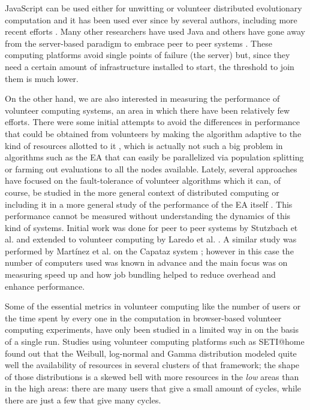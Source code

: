 \documentclass[letterpaper]{article}
\begin{document}
JavaScript can be used either for unwitting
\citep{unwitting-ec,boldrin2007distributed} or volunteer 
\citep{langdon:2005:metas,gecco07:workshop:dcor} distributed
evolutionary computation and it has been used ever since by several
authors, including more recent efforts
\citep{Desell:2008:AHG:1389095.1389273,duda2013distributed,DBLP:journals/corr/abs-0801-1210}. Many other researchers have
used Java \citep{chong:1999:jDGPi} and others have gone away from the
server-based paradigm to embrace peer to peer systems
\citep{jin2006constructing,10.1109/ICICSE.2008.99,DBLP:conf/3pgcic/GuervosMFEL12}. These computing
platforms avoid single points of failure (the server) but, since they
need a certain amount of infrastructure installed to start, the
threshold to join them is much lower.


On the other hand, we are also interested in measuring the performance
of volunteer computing systems, an area in which there have been
relatively few efforts.
There were some initial attempts to avoid the differences in performance
that could be obtained from volunteers  by making
the algorithm adaptive to the kind of resources allotted to it
\citep{milani2004online}, which is actually not such a big problem in
algorithms such as the EA that can easily be
parallelized via population splitting or farming out evaluations to all
the nodes available. Lately, several approaches have focused on the
fault-tolerance of volunteer algorithms
\citep{gonzalez2010characterizing} which it can, of course, be studied in
the more general context of distributed computing 
\citep{nogueras2015studying} or including it in a more general study of the
performance of the EA itself
\citep{DBLP:journals/gpem/LaredoBGVAGF14}. This performance cannot be
measured without understanding the dynamics of this kind of systems. Initial
work was done for peer to peer systems by Stutzbach et
al. \citep{stutzbach2006understanding} and extended to volunteer
computing by Laredo et al. \citep{churn08,laredo2008rcp}. A similar
study was performed by Martínez et al. on the Capataz system
\citep{martinez2015capataz}; however in this case the number of
computers used was known in advance and the main focus was on
measuring speed up and how job bundling helped to reduce overhead and
enhance performance. 

Some of the essential metrics in volunteer computing like the
number of users or the time spent by every one in the
computation in browser-based volunteer computing experiments, have
only been studied in a limited way in 
\citep{DBLP:journals/gpem/LaredoBGVAGF14} on the basis of a single
run. Studies using volunteer computing platforms such as SETI@home
\citep{javadi2009mining,agajaj} found out that the Weibull, log-normal and
Gamma distribution 
modeled quite well the availability of resources in several clusters
of that framework; the shape of those distributions is a skewed bell
with more resources in the {\em low} areas than in the high areas:
there are many users that give a small amount of cycles, while there
are just a few that give many cycles. 
\end{document}

